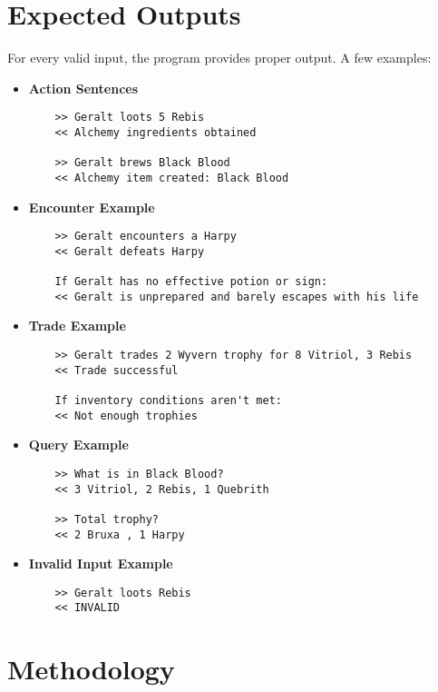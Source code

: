 \documentclass{article}
\begin{document}
\section*{Expected Outputs}

For every valid input, the program provides proper output. A few examples:

\begin{itemize}
    \item \textbf{Action Sentences}
    \begin{verbatim}
    >> Geralt loots 5 Rebis
    << Alchemy ingredients obtained

    >> Geralt brews Black Blood
    << Alchemy item created: Black Blood
    \end{verbatim}

    \item \textbf{Encounter Example}
    \begin{verbatim}
    >> Geralt encounters a Harpy
    << Geralt defeats Harpy

    If Geralt has no effective potion or sign:
    << Geralt is unprepared and barely escapes with his life
    \end{verbatim}

    \item \textbf{Trade Example}
    \begin{verbatim}
    >> Geralt trades 2 Wyvern trophy for 8 Vitriol, 3 Rebis
    << Trade successful

    If inventory conditions aren't met:
    << Not enough trophies
    \end{verbatim}

    \item \textbf{Query Example}
    \begin{verbatim}
    >> What is in Black Blood?
    << 3 Vitriol, 2 Rebis, 1 Quebrith

    >> Total trophy?
    << 2 Bruxa , 1 Harpy
    \end{verbatim}

    \item \textbf{Invalid Input Example}
    \begin{verbatim}
    >> Geralt loots Rebis
    << INVALID
    \end{verbatim}
\end{itemize}

\section{Methodology}
\end{document}
